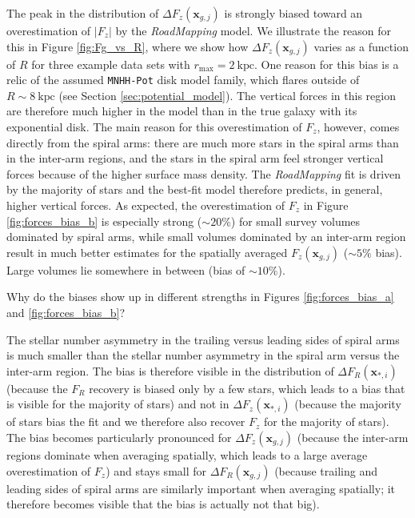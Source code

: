 \documentclass[iop,revtex4,numberedappendix,appendixfloats]{emulateapj}
\newcommand{\vect}[1]{\boldsymbol{#1}}
\newcommand{\RM}{{\sl RoadMapping}}
\begin{document}
The peak in the distribution of $\Delta F_z(\vect{x}_{g,j})$ is strongly biased toward an overestimation of $|F_{z}|$ by the \RM{} model. We illustrate the reason for this in Figure \ref{fig:Fg_vs_R}, where we show how $\Delta F_z(\vect{x}_{g,j})$ varies as a function of $R$ for three example data sets with $r_\text{max}=2~\text{kpc}$. One reason for this bias is a relic of the assumed \texttt{MNHH-Pot} disk model family, which flares outside of $R\sim8~\text{kpc}$ (see Section \ref{sec:potential_model}). The vertical forces in this region are therefore much higher in the model than in the true galaxy with its exponential disk. The main reason for this overestimation of $F_z$, however, comes directly from the spiral arms: there are much more stars in the spiral arms than in the inter-arm regions, and the stars in the spiral arm feel stronger vertical forces because of the higher surface mass density. The \RM{} fit is driven by the majority of stars and the best-fit model therefore predicts, in general, higher vertical forces. As expected, the overestimation of $F_{z}$ in Figure \ref{fig:forces_bias_b} is especially strong ($\sim 20 \%$) for small survey volumes dominated by spiral arms, while small volumes dominated by an inter-arm region result in much better estimates for the spatially averaged $F_z(\vect{x}_{g,j})$ ($\sim5\%$ bias). Large volumes lie somewhere in between (bias of $\sim10\%$).

Why do the biases show up in different strengths in Figures \ref{fig:forces_bias_a} and \ref{fig:forces_bias_b}?

The stellar number asymmetry in the trailing versus leading sides of spiral arms is much smaller than the stellar number asymmetry in the spiral arm versus the inter-arm region. The bias is therefore visible in the distribution of $\Delta F_R(\vect{x}_{*,i})$ (because the $F_R$ recovery is biased only by a few stars, which leads to a bias that is visible for the majority of stars) and not in $\Delta F_z(\vect{x}_{*,i})$ (because the majority of stars bias the fit and we therefore also recover $F_z$ for the majority of stars). The bias becomes particularly pronounced for $\Delta F_z(\vect{x}_{g,j})$ (because the inter-arm regions dominate when averaging spatially, which leads to a large average overestimation of $F_z$) and stays small for $\Delta F_R(\vect{x}_{g,j})$ (because trailing and leading sides of spiral arms are similarly important when averaging spatially; it therefore becomes visible that the bias is actually not that big).
\end{document}
